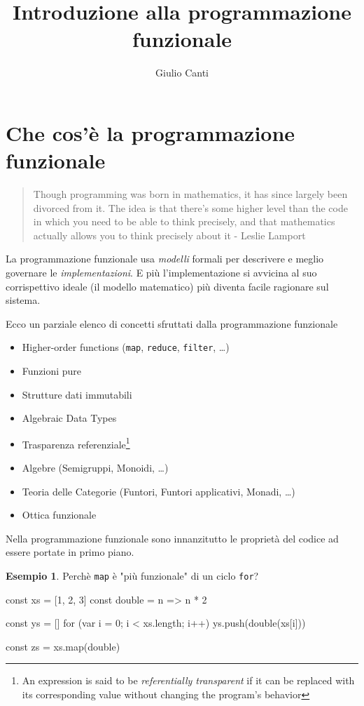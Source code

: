 \documentclass[12pt]{article}
\title{
  Introduzione alla programmazione funzionale
}
\author{Giulio Canti}
\theoremstyle{definition}
\newtheorem{example}{Esempio}[section]
\newenvironment{code}
  {\vspace{0.5cm} \VerbatimEnvironment\begin{typescriptcode}}
  {\end{typescriptcode} \vspace{0.2cm}}
\begin{document}
\maketitle

\tableofcontents

\newpage

\section{Che cos'è la programmazione funzionale}

\begin{quote}
Though programming was born in mathematics, it has since largely been divorced from it.
The idea is that there's some higher level than the code in which you need to be able to think precisely,
and that mathematics actually allows you to think precisely about it - Leslie Lamport
\end{quote}

La programmazione funzionale usa \emph{modelli} formali per descrivere e meglio governare le \emph{implementazioni}.
E più l'implementazione si avvicina al suo corrispettivo ideale (il modello matematico)
più diventa facile ragionare sul sistema.

Ecco un parziale elenco di concetti sfruttati dalla programmazione funzionale

\begin{itemize}
  \item Higher-order functions (\texttt{map}, \texttt{reduce}, \texttt{filter},  \ldots)
  \item Funzioni pure
  \item Strutture dati immutabili
  \item Algebraic Data Types
  \item Trasparenza referenziale\footnote{An expression is said to be \emph{referentially transparent} if it can be replaced with its corresponding value without changing the program's behavior}
  \item Algebre (Semigruppi, Monoidi, \ldots)
  \item Teoria delle Categorie (Funtori, Funtori applicativi, Monadi, \ldots)
  \item Ottica funzionale
\end{itemize}

Nella programmazione funzionale sono innanzitutto le proprietà del codice ad essere portate in primo piano.

\begin{example}
Perchè \texttt{map} è "più funzionale" di un ciclo \texttt{for}?

\begin{code}
const xs = [1, 2, 3]
const double = n => n * 2

const ys = []
for (var i = 0; i < xs.length; i++) {
  ys.push(double(xs[i]))
}

const zs = xs.map(double)
\end{code}

\end{example}
\end{document}
